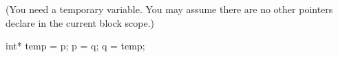 (You need a temporary variable. You may assume there are no other
pointers declare in the current block scope.)
\\
\ANSWER
\begin{answercode}
int* temp = p;
p = q;
q = temp;
\end{answercode}


